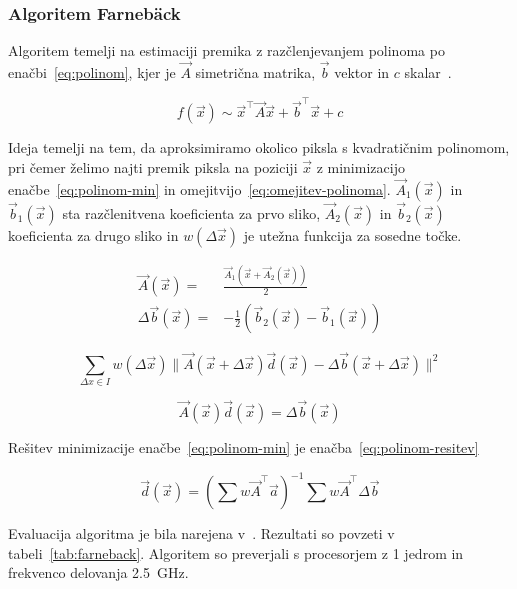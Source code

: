 \subsubsection{Algoritem Farneb{\"a}ck}
Algoritem temelji na estimaciji premika z razčlenjevanjem polinoma  po enačbi~\eqref{eq:polinom}, kjer je $\vec{A}$ simetrična matrika, $\vec{b}$ vektor in $c$ skalar~\cite{farneback2003two}.

\begin{equation}\label{eq:polinom}
	f(\vec{x}) \sim \vec{x}^\top \vec{A} \vec{x} + \vec{b}^\top \vec{x} + c
\end{equation}

Ideja temelji na tem, da aproksimiramo okolico piksla s kvadratičnim polinomom, pri čemer želimo najti premik piksla na poziciji $\vec{x}$ z minimizacijo enačbe~\eqref{eq:polinom-min} in omejitvijo~\eqref{eq:omejitev-polinoma}. $\vec{A}_1(\vec{x})$ in $\vec{b}_1(\vec{x})$ sta razčlenitvena koeficienta za prvo sliko, $\vec{A}_2(\vec{x})$ in $\vec{b}_2(\vec{x})$ koeficienta za drugo sliko in $w(\Delta\vec{x})$ je utežna funkcija za sosedne točke.

\begin{align}
\vec{A}(\vec{x}) = & \frac{\vec{A}_1(\vec{x} + \vec{A}_2(\vec{x}))}{2} \\
\Delta\vec{b}(\vec{x}) = & - \frac{1}{2}\left(\vec{b}_2(\vec{x}) - \vec{b}_1(\vec{x})\right) 
\end{align}

\begin{equation}\label{eq:polinom-min}
\sum_{\Delta x \in I} w(\Delta\vec{x}) \| \vec{A}(\vec{x} + \Delta\vec{x})\vec{d}(\vec{x}) - \Delta\vec{b}(\vec{x} +\Delta\vec{x}) \|^2
\end{equation}

\begin{equation}\label{eq:omejitev-polinoma}
\vec{A}(\vec{x})\vec{d}(\vec{x}) = \Delta\vec{b}(\vec{x})
\end{equation}

Rešitev minimizacije enačbe~\eqref{eq:polinom-min} je enačba~\eqref{eq:polinom-resitev}

\begin{equation}\label{eq:polinom-resitev}
 \vec{d}(\vec{x}) = \left( \sum w \vec{A}^\top \vec{a} \right)^{-1} \sum w \vec{A}^\top \Delta\vec{b}
\end{equation}

Evaluacija algoritma je bila narejena v~\cite{Geiger2012CVPR}. Rezultati so povzeti v tabeli~\ref{tab:farneback}. Algoritem so preverjali s procesorjem z 1 jedrom in frekvenco delovanja \SI{2.5}{GHz}.

